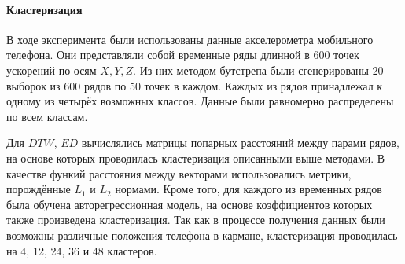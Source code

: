 \documentclass[12pt,twoside]{article}
\begin{document}
        
        \paragraph{Кластеризация}
        В ходе эксперимента были использованы данные акселерометра мобильного телефона.
        Они представляли собой временные ряды длинной в 600 точек ускорений по осям $X, Y, Z$.
        Из них методом бутстрепа были сгенерированы 20 выборок из 600 рядов по 50 точек в каждом. 
        Каждых из рядов принадлежал к одному из четырёх возможных классов. Данные были равномерно распределены по всем классам.

        Для $DTW$, $ED$ вычислялись матрицы попарных расстояний между парами рядов, на основе которых проводилась кластеризация описанными выше методами.
        В качестве функий расстояния между векторами использовались метрики, порождённые $L_1$  и $L_2$ нормами.
        Кроме того, для каждого из временных рядов была обучена авторегрессионная модель, на основе коэффициентов которых также произведена кластеризация.
        Так как в процессе получения данных были возможны различные положения телефона в кармане, кластеризация проводилась на 4, 12, 24, 36 и 48 кластеров.
\end{document}
